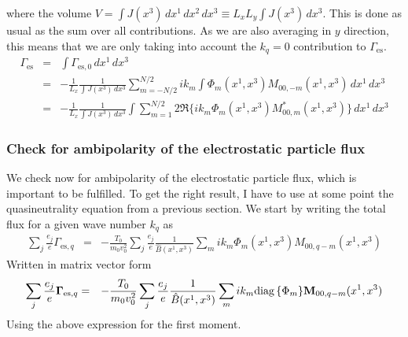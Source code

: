 where the volume $V=\int J(x^3)\,dx^1\,dx^2\,dx^3\equiv L_x L_y \int J(x^3)\,dx^3$.
This is done as usual as the sum over all
contributions. As we are also averaging in $y$ direction, this means
that we are only taking into account the $k_q=0$ contribution to $\Gamma_\mathrm{es}$.
\begin{eqnarray*}
  \Gamma_\mathrm{es} &=& 
  \int \Gamma_{\mathrm{es},0}\,dx^1\,dx^3\\
  &=& -\frac{1}{L_x}\frac{1}{\int J(x^3)\,dx^3}
  \sum_{m=-N/2}^{N/2} ik_m \int\Phi_m(x^1,x^3)  M_{00,-m}(x^1,x^3) \,dx^1\,dx^3\\
  &=& -\frac{1}{L_x}\frac{1}{\int J(x^3)\,dx^3}\int
  \sum_{m=1}^{N/2} 2\Re\{ik_m\Phi_m(x^1,x^3)  M_{00,m}^*(x^1,x^3)\} \,dx^1\,dx^3
\end{eqnarray*}

\subsubsection{Check for ambipolarity of the electrostatic particle flux}
We check now for ambipolarity of the electrostatic particle flux,
which is important to be fulfilled. To get the right result, I have to
use at some point the quasineutrality equation from a previous
section. We start by writing the total flux for a given wave number
$k_q$ as
\begin{eqnarray*}
  \sum_j\frac{e_j}{e}\Gamma_{\mathrm{es},q} 
  &=&-\frac{T_0}{m_0v_0^2}\sum_j\frac{e_j}{e}\frac{1}{\hat{B}(x^1,x^3)}\sum_m ik_m\Phi_m(x^1,x^3)M_{00,q-m}(x^1,x^3)
\end{eqnarray*}
Written in matrix vector form
\begin{eqnarray*}
  \sum_j\frac{e_j}{e}\mathbf{\Gamma}_{\mathrm{es},q} 
  &=&-\frac{T_0}{m_0v_0^2}\sum_j\frac{e_j}{e}\frac{1}{\hat{B}(x^1,x^3)}\sum_m ik_m\mbox{diag}\,\{\Phi_m\}\mathbf{M}_{00,q-m}(x^1,x^3)
\end{eqnarray*}
Using the above expression for the first moment.

